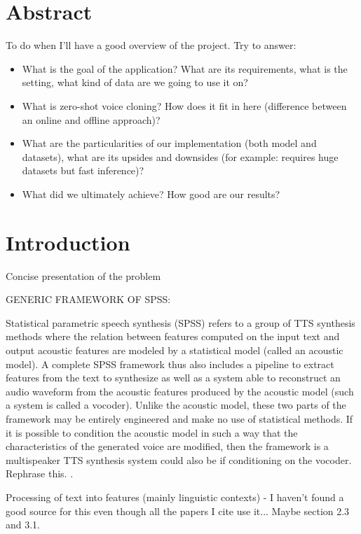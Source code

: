 \documentclass[a4paper, oneside]{article}
\begin{document}
\section{Abstract}
\color{red}
To do when I'll have a good overview of the project. Try to answer:
\begin{itemize}
	\item What is the goal of the application? What are its requirements, what is the setting, what kind of data are we going to use it on?
	\item What is zero-shot voice cloning? How does it fit in here (difference between an online and offline approach)?
	\item What are the particularities of our implementation (both model and datasets), what are its upsides and downsides (for example: requires huge datasets but fast inference)?
	\item What did we ultimately achieve? How good are our results?
\end{itemize}
\color{black}

\section{Introduction}

\color{red}
Concise presentation of the problem

GENERIC FRAMEWORK OF SPSS:

\color{black}
Statistical parametric speech synthesis (SPSS) refers to a group of TTS synthesis methods where the relation between features computed on the input text and output acoustic features are modeled by a statistical model (called an acoustic model). A complete SPSS framework thus also includes a pipeline to extract features from the text to synthesize as well as a system able to reconstruct an audio waveform from the acoustic features produced by the acoustic model (such a system is called a vocoder). Unlike the acoustic model, these two parts of the framework may be entirely engineered and make no use of statistical methods. If it is possible to condition the acoustic model in such a way that the characteristics of the generated voice are modified, then the framework is a multispeaker TTS synthesis system \color{red} could also be if conditioning on the vocoder. Rephrase this. \color{black}.

\color{red}
Processing of text into features (mainly linguistic contexts) - I haven't found a good source for this even though all the papers I cite use it... Maybe \cite{OnTheTrainingAspects} section 2.3 and 3.1.
\end{document}
